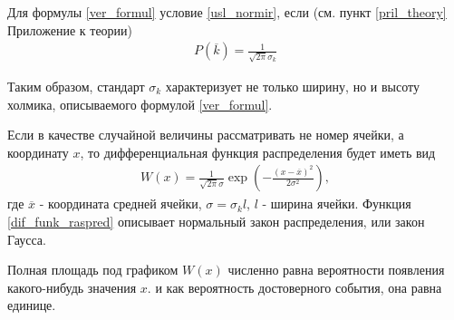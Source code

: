 Для формулы \eqref{ver_formul} условие \eqref{usl_normir}, если (см.  пункт \ref{pril_theory} Приложение к теории)
\begin{align} \label{th:3:1}
	P(\overline{k}) = \frac{1}{\sqrt{2 \pi} \sigma_k}
\end{align}

Таким образом, стандарт $\sigma_k$ характеризует не только ширину, но и высоту холмика, описываемого формулой \eqref{ver_formul}.

Если в качестве случайной величины рассматривать не номер ячейки, а координату $x$, то дифференциальная функция распределения будет иметь вид
\begin{align} \label{dif_funk_raspred}
	W(x) = \frac{1}{\sqrt{2 \pi} \sigma} \exp \left(- \frac{(x - \overline{x})^2}{2 \sigma^2}\right),
\end{align}
где $\overline{x}$ - координата средней ячейки, $\sigma = \sigma_k l$, $l$ - ширина ячейки. Функция \eqref{dif_funk_raspred} описывает нормальный закон распределения, или закон Гаусса.

Полная площадь под графиком $W(x)$ численно равна вероятности появления какого-нибудь значения $x$. и как вероятность достоверного события, она равна единице.
